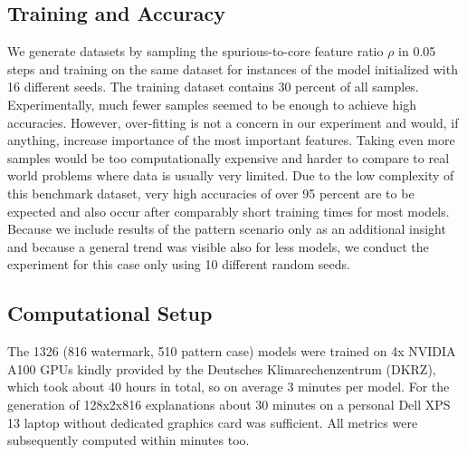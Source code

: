 \subsection{Training and Accuracy}
We generate datasets by sampling the spurious-to-core feature ratio $\rho$ in 0.05 steps and training on the same dataset for instances of the model initialized with 16 different seeds. The training dataset contains 30 percent of all samples. Experimentally, much fewer samples seemed to be enough to achieve high accuracies. However, over-fitting is not a concern in our experiment and would, if anything, increase importance of the most important features. Taking even more samples would be too computationally expensive and harder to compare to real world problems where data is usually very limited. 
Due to the low complexity of this benchmark dataset, very high accuracies of over 95 percent are to be expected and also occur after comparably short training times for most models. \\
Because we include results of the pattern scenario only as an additional insight and because a general trend was visible also for less models, we conduct the experiment for this case only using 10 different random seeds. 

\subsection{Computational Setup}\label{appendix:setup}
The 1326 (816 watermark, 510 pattern case) models were trained on 4x NVIDIA A100 GPUs kindly provided by the Deutsches Klimarechenzentrum (DKRZ), which took about 40 hours in total, so on average 3 minutes per model. 
For the generation of 128x2x816 explanations about 30 minutes on a personal Dell XPS 13 laptop without dedicated graphics card was sufficient. All metrics were subsequently computed within minutes too. 


